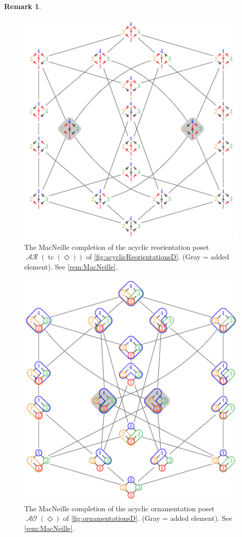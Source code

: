 \documentclass{amsart}
\theoremstyle{definition}
\newtheorem{remark}[theorem]{Remark}
\renewcommand{\c}[1]{\mathcal{#1}} %
\DeclareMathOperator{\tc}{tc} %
\DeclareMathOperator{\AOrn}{\c{AO}}  %
\DeclareMathOperator{\AReori}{\c{AR}}  %
\newcommand{\Dgraph}{\boldsymbol{\Diamond}} %
\begin{document}
\begin{remark}
\begin{figure}
	\centerline{\includegraphics[scale=.68]{MacNeilleAcyclicReorientationsD}}
	\caption{The MacNeille completion of the acyclic reorientation poset~$\AReori(\tc(\Dgraph))$ of \cref{fig:acyclicReorientationsD}. (Gray = added element). See \cref{rem:MacNeille}.}
	\label{fig:MacNeilleAcyclicReorientationsD}
\end{figure}
%
\begin{figure}
	\centerline{\includegraphics[scale=.68]{MacNeilleAcyclicOrnamentationsD}}
	\caption{The MacNeille completion of the acyclic ornamentation poset~$\AOrn(\Dgraph)$ of \cref{fig:ornamentationsD}. (Gray = added element). See \cref{rem:MacNeille}.}
	\label{fig:MacNeilleAcyclicOrnamentationsD}
\end{figure}
\end{remark}
\end{document}
